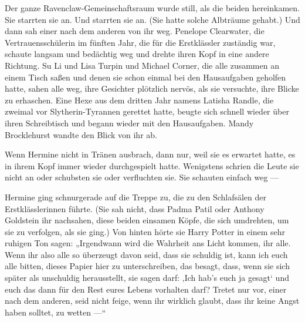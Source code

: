 Der ganze Ravenclaw-Gemeinschaftsraum wurde still, als die beiden hereinkamen. Sie starrten sie an. Und starrten sie an. (Sie hatte solche Albträume gehabt.) Und dann sah einer nach dem anderen von ihr weg. Penelope Clearwater, die Vertrauensschülerin im fünften Jahr, die für die Erstklässler zuständig war, schaute langsam und bedächtig weg und drehte ihren Kopf in eine andere Richtung. Su Li und Lisa Turpin und Michael Corner, die alle zusammen an einem Tisch saßen und denen sie schon einmal bei den Hausaufgaben geholfen hatte, sahen alle weg, ihre Gesichter plötzlich nervös, als sie versuchte, ihre Blicke zu erhaschen. Eine Hexe aus dem dritten Jahr namens Latisha Randle, die \SPHEW zweimal vor Slytherin-Tyrannen gerettet hatte, beugte sich schnell wieder über ihren Schreibtisch und begann wieder mit den Hausaufgaben. Mandy Brocklehurst wandte den Blick von ihr ab.

Wenn Hermine nicht in Tränen ausbrach, dann nur, weil sie es erwartet hatte, es in ihrem Kopf immer wieder durchgespielt hatte. Wenigstens schrien die Leute sie nicht an oder schubsten sie oder verfluchten sie. Sie schauten einfach weg —

Hermine ging schnurgerade auf die Treppe zu, die zu den Schlafsälen der Erstklässlerinnen führte. (Sie sah nicht, dass Padma Patil oder Anthony Goldstein ihr nachsahen, diese beiden einsamen Köpfe, die sich umdrehten, um sie zu verfolgen, als sie ging.) Von hinten hörte sie Harry Potter in einem sehr ruhigen Ton sagen:
„Irgendwann wird die Wahrheit ans Licht kommen, ihr alle. Wenn ihr also alle so überzeugt davon seid, dass sie schuldig ist, kann ich euch alle bitten, dieses Papier hier zu unterschreiben, das besagt, dass, wenn sie sich später als unschuldig herausstellt, sie sagen darf: ‚Ich hab’s euch ja gesagt‘ und euch das dann für den Rest eures Lebens vorhalten darf? Tretet nur vor, einer nach dem anderen, seid nicht feige, wenn ihr wirklich glaubt, dass ihr keine Angst haben solltet, zu wetten —“

